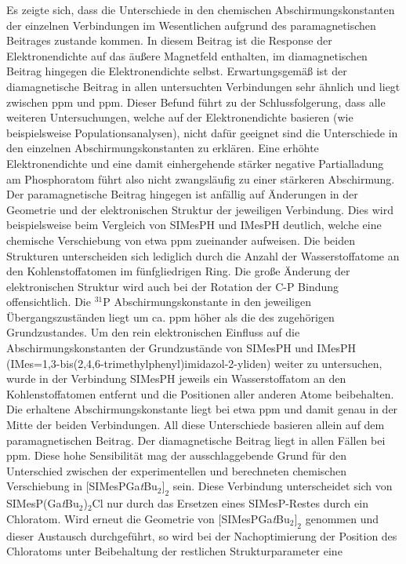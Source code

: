 Es zeigte sich, dass die Unterschiede in den chemischen Abschirmungskonstanten der einzelnen Verbindungen im Wesentlichen aufgrund des paramagnetischen Beitrages zustande kommen. In diesem Beitrag ist die Response der Elektronendichte auf das äußere Magnetfeld enthalten, im diamagnetischen Beitrag hingegen die Elektronendichte selbst. Erwartungsgemäß ist der diamagnetische Beitrag in allen untersuchten Verbindungen sehr ähnlich und liegt zwischen \unit[960]{ppm} und \unit[967]{ppm}. Dieser Befund führt zu der Schlussfolgerung, dass alle weiteren Untersuchungen, welche auf der Elektronendichte basieren (wie beispielsweise Populationsanalysen), nicht dafür geeignet sind die Unterschiede in den einzelnen Abschirmungskonstanten zu erklären. Eine erhöhte Elektronendichte und eine damit einhergehende stärker negative Partialladung am Phosphoratom führt also nicht zwangsläufig zu einer stärkeren Abschirmung. Der paramagnetische Beitrag hingegen ist anfällig auf Änderungen in der Geometrie und der elektronischen Struktur der jeweiligen Verbindung. Dies wird beispielsweise beim Vergleich von SIMesPH und IMesPH deutlich, welche eine chemische Verschiebung von etwa \unit[20]{ppm} zueinander aufweisen. Die beiden Strukturen unterscheiden sich lediglich durch die Anzahl der Wasserstoffatome an den Kohlenstoffatomen im fünfgliedrigen Ring. Die große Änderung der elektronischen Struktur wird auch bei der Rotation der C-P Bindung offensichtlich. Die $^{31}$P Abschirmungskonstante in den jeweiligen Übergangszuständen liegt um ca. \unit[60]{ppm} höher als die des zugehörigen Grundzustandes. Um den rein elektronischen Einfluss auf die Abschirmungskonstanten der Grundzustände von SIMesPH und IMesPH (IMes=1,3-bis(2,4,6-tri\-me\-thyl\-phe\-nyl)imi\-da\-zol-2-yli\-den) weiter zu untersuchen, wurde in der Verbindung SIMesPH jeweils ein Wasserstoffatom an den Kohlenstoffatomen entfernt und die Positionen aller anderen Atome beibehalten. Die erhaltene Abschirmungskonstante liegt bei etwa \unit[444]{ppm} und damit genau in der Mitte der beiden Verbindungen. All diese Unterschiede basieren allein auf dem paramagnetischen Beitrag. Der diamagnetische Beitrag liegt in allen Fällen bei \unit[962]{ppm}.
Diese hohe Sensibilität mag der ausschlaggebende Grund für den Unterschied zwischen der experimentellen und berechneten chemischen Verschiebung in $[$SIMesPGa\textit{t}Bu$_2]_2$ sein. Diese Verbindung unterscheidet sich von SIMesP(Ga\textit{t}Bu$_2$)$_2$Cl nur durch das Ersetzen eines SIMesP-Restes durch ein Chloratom. Wird erneut die Geometrie von $[$SIMesPGa\textit{t}Bu$_2]_2$ genommen und dieser Austausch durchgeführt, so wird bei der Nachoptimierung der Position des Chloratoms unter Beibehaltung der restlichen Strukturparameter eine 
